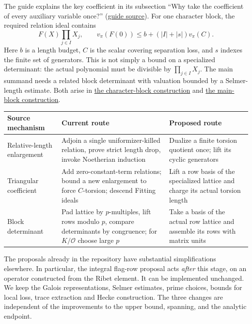 \documentclass[11pt]{article}
\newcommand{\Ocal}{\mathcal O}
\newcommand{\val}{v_\pi}
\newcommand{\src}[3]{\href{https://github.com/VladimirReshetnikov/ProveIt/blob/835c3695d07c0f77060c5cc63f92eeb52a7d21c2/Analysis/GeneralizedRiemannHypothesis/Lean/grh/src/#1.lean\#L#2}{#3}}
\newcommand{\rmatrix}[2]{\src{New/Congruences/FirstOrder/RibetMatrices}{#1}{#2}}
\begin{document}
The guide explains the key coefficient in its subsection ``Why take the coefficient of every auxiliary variable once?'' (\href{https://github.com/VladimirReshetnikov/ProveIt/blob/835c3695d07c0f77060c5cc63f92eeb52a7d21c2/Analysis/GeneralizedRiemannHypothesis/docs/guide/theta_lifts_and_dirichlet_zeros.tex\#L1363}{guide source}). For one character block, the required relation ideal contains
\[
             F(X)\prod_{j\in I}X_j,\qquad
             \val(F(0))\le b+(|I|+|s|)\val(C).
\]
Here $b$ is a length budget, $C$ is the scalar covering separation loss, and $s$ indexes the finite set of generators. This is not simply a bound on a specialized determinant: the actual polynomial must be divisible by $\prod_{j\in I}X_j$. The main summand needs a related block determinant with valuation bounded by a Selmer-length estimate. Both arise in \rmatrix{724}{the character-block construction} and \rmatrix{539}{the main-block construction}.

\begin{center}\small
\begin{tabularx}{\linewidth}{@{}p{.27\linewidth}XX@{}}
\toprule
Source mechanism & Current route & Proposed route\\\midrule
Relative-length enlargement & Adjoin a single uniformizer-killed relation, prove strict length drop, invoke Noetherian induction & Dualize a finite torsion quotient once; lift its cyclic generators\\
Triangular coefficient & Add zero-constant-term relations; bound a new enlargement to force $C$-torsion; descend Fitting ideals & Lift a row basis of the specialized lattice and charge its actual torsion length\\
Block determinant & Pad lattice by $p$-multiples, lift rows modulo $p$, compare determinants by congruence; for $K/\Ocal$ choose large $p$ & Take a basis of the actual row lattice and assemble its rows with matrix units\\\bottomrule
\end{tabularx}
\end{center}
The proposals already in the repository have substantial simplifications elsewhere. In particular, the integral flag-row proposal acts \emph{after} this stage, on an operator constructed from the Ribet element. It can be implemented unchanged. We keep the Galois representations, Selmer estimates, prime choices, bounds for local loss, trace extraction and Hecke construction. The three changes are independent of the improvements to the upper bound, spanning, and the analytic endpoint.
\end{document}
